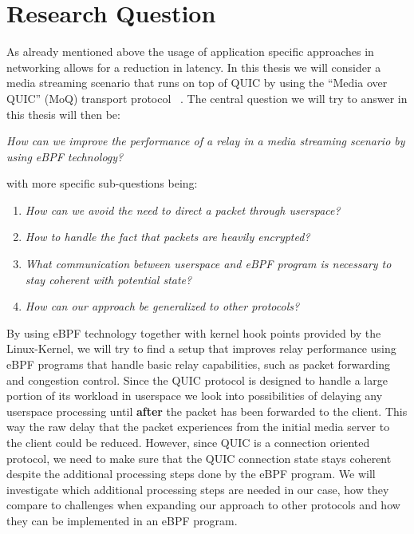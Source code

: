 \section{Research Question}\label{sec:research_question}

As already mentioned above the usage of application specific approaches in networking allows for a reduction in latency.
In this thesis we will consider a media streaming scenario that runs on top of QUIC by using the ``Media over QUIC'' (MoQ) transport protocol
~\parencite{draft-moqtransport}.
The central question we will try to answer in this thesis will then be:
\vspace{0.5cm}
\begin{center}
    \textit{How can we improve the performance of a relay in a media streaming scenario by using eBPF technology?}
\end{center}
\vspace{0.5cm}
with more specific sub-questions being:
\vspace{0.5cm}
\begin{enumerate}
    \item \textit{How can we avoid the need to direct a packet through userspace?}
    \item \textit{How to handle the fact that packets are heavily encrypted?}
    \item \textit{What communication between userspace and eBPF program is necessary to stay coherent with potential state?}
    \item \textit{How can our approach be generalized to other protocols?}
\end{enumerate}
\vspace{0.5cm}
By using eBPF technology together with kernel hook points provided by the Linux-Kernel, we will try to find a setup that improves relay 
performance using eBPF programs that handle basic relay capabilities, such as packet forwarding and congestion control.
Since the QUIC protocol is designed to handle a large portion of its workload in userspace we look into possibilities of delaying any 
userspace processing until \textbf{after} the packet has been forwarded to the client.
This way the raw delay that the packet experiences from the initial media server to the client could be reduced. 
However, since QUIC is a connection oriented protocol, we need to make sure that the QUIC connection state stays 
coherent despite the additional processing steps done by the eBPF program.
We will investigate which additional processing steps are needed in our case, how they compare to challenges when expanding our approach to other
protocols and how they can be implemented in an eBPF program.
